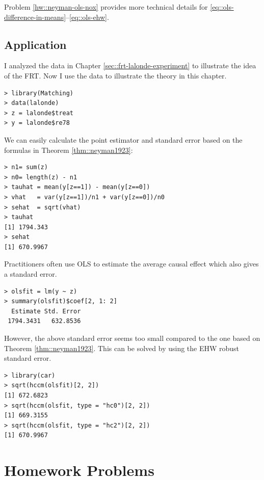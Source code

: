 Problem \ref{hw::neyman-ols-nox} provides more technical details for \eqref{eq::ols-difference-in-means}--\eqref{eq::ols-ehw}. 
 



 

 
 
 


\subsection{Application}
\label{sec::example-neyman-formula}


I analyzed the  data in Chapter \ref{sec::frt-lalonde-experiment} to illustrate the idea of the FRT. Now I use the data to illustrate the theory in this chapter. 
\begin{lstlisting}
> library(Matching)
> data(lalonde)
> z = lalonde$treat
> y = lalonde$re78
\end{lstlisting} 

We can easily calculate the point estimator and standard error based on the formulas in Theorem \ref{thm::neyman1923}:
\begin{lstlisting}
> n1= sum(z)
> n0= length(z) - n1
> tauhat = mean(y[z==1]) - mean(y[z==0])
> vhat   = var(y[z==1])/n1 + var(y[z==0])/n0
> sehat  = sqrt(vhat)
> tauhat
[1] 1794.343
> sehat
[1] 670.9967
\end{lstlisting} 

Practitioners often use OLS to estimate the average causal effect which also gives a standard error. 
\begin{lstlisting}
> olsfit = lm(y ~ z)
> summary(olsfit)$coef[2, 1: 2]
  Estimate Std. Error 
 1794.3431   632.8536 
 \end{lstlisting} 
However, the above standard error seems too small compared to the one based on  Theorem \ref{thm::neyman1923}.  This can be solved by using the EHW robust standard error. 
\begin{lstlisting}
> library(car)
> sqrt(hccm(olsfit)[2, 2])
[1] 672.6823
> sqrt(hccm(olsfit, type = "hc0")[2, 2])
[1] 669.3155
> sqrt(hccm(olsfit, type = "hc2")[2, 2])
[1] 670.9967
 \end{lstlisting} 





\section{Homework Problems}

